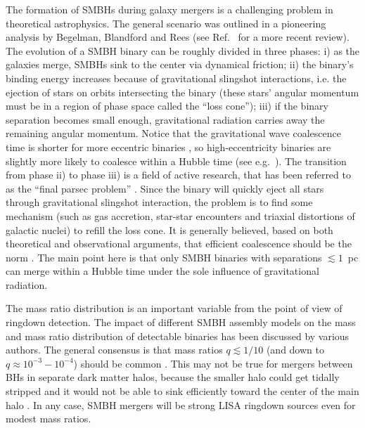 \documentclass[]{iopart}
\begin{document}
The formation of SMBHs during galaxy mergers is a challenging problem in
theoretical astrophysics. The general scenario was outlined in a pioneering
analysis by Begelman, Blandford and Rees \cite{Begelman:1980vb} (see
Ref.~\cite{Merritt:2004gc} for a more recent review). The evolution of a SMBH
binary can be roughly divided in three phases: i) as the galaxies merge, SMBHs
sink to the center via dynamical friction; ii) the binary's binding energy
increases because of gravitational slingshot interactions, i.e. the ejection
of stars on orbits intersecting the binary (these stars' angular momentum must
be in a region of phase space called the ``loss cone''); iii) if the binary
separation becomes small enough, gravitational radiation carries away the
remaining angular momentum. Notice that the gravitational wave coalescence
time is shorter for more eccentric binaries \cite{Peters:1963ux}, so
high-eccentricity binaries are slightly more likely to coalesce within a
Hubble time (see e.g.~\cite{Berti:2006ew}).
%
The transition from phase ii) to phase iii) is a field of active research,
that has been referred to as the ``final parsec problem''
\cite{Merritt:2004gc}. Since the binary will quickly eject all stars through
gravitational slingshot interaction, the problem is to find some mechanism
(such as gas accretion, star-star encounters and triaxial distortions of
galactic nuclei) to refill the loss cone. It is generally believed, based on
both theoretical and observational arguments, that efficient coalescence
should be the norm \cite{Berti:2006ew}.  The main point here is that only SMBH
binaries with separations $\lesssim 1$~pc can merge within a Hubble time under
the sole influence of gravitational radiation.

The mass ratio distribution is an important variable from the point of view of
ringdown detection.  The impact of different SMBH assembly models on the mass
and mass ratio distribution of detectable binaries has been discussed by
various authors. The general consensus is that mass ratios $q\lesssim 1/10$
(and down to $q\approx 10^{-3}-10^{-4}$) should be common
\cite{Volonteri:2002vz,Volonteri:2004cf,Sesana:2007sh,Koushiappas:2005qz,
  Gergely:2008mt,Gergely:2007ny}. This may not be true for mergers between BHs
in separate dark matter halos, because the smaller halo could get tidally
stripped and it would not be able to sink efficiently toward the center of the
main halo \cite{Taffoni:2003sr}.
In any case, SMBH mergers will be strong LISA ringdown sources even for modest
mass ratios.
\end{document}
